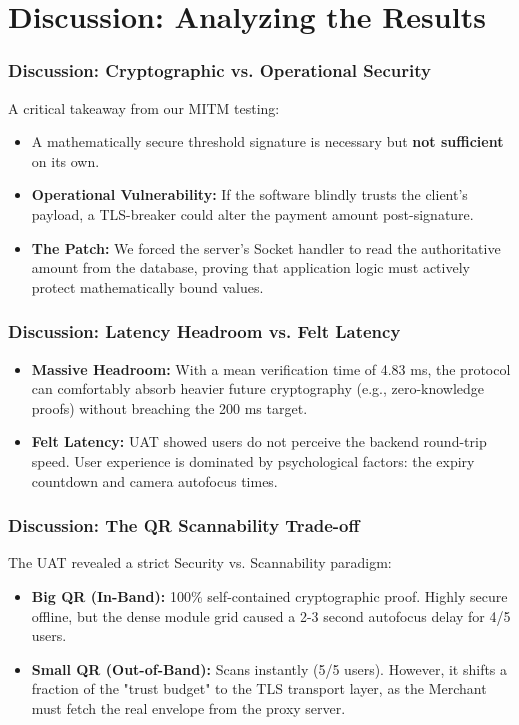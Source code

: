 \documentclass{beamer}
\begin{document}
\section{Discussion: Analyzing the Results}
\begin{frame}
  \frametitle{Discussion: Cryptographic vs. Operational Security}
  A critical takeaway from our MITM testing:
  \vspace{0.3cm}
  \begin{itemize}
      \item A mathematically secure threshold signature is necessary but \textbf{not sufficient} on its own.
      \item \textbf{Operational Vulnerability:} If the software blindly trusts the client's payload, a TLS-breaker could alter the payment amount post-signature.
      \item \textbf{The Patch:} We forced the server's Socket handler to read the authoritative amount from the database, proving that application logic must actively protect mathematically bound values.
  \end{itemize}
\end{frame}

\begin{frame}
  \frametitle{Discussion: Latency Headroom vs. Felt Latency}
  \begin{itemize}
      \item \textbf{Massive Headroom:} With a mean verification time of 4.83 ms, the protocol can comfortably absorb heavier future cryptography (e.g., zero-knowledge proofs) without breaching the 200 ms target.
      \item \textbf{Felt Latency:} UAT showed users do not perceive the backend round-trip speed. User experience is dominated by psychological factors: the expiry countdown and camera autofocus times.
  \end{itemize}
\end{frame}

\begin{frame}
  \frametitle{Discussion: The QR Scannability Trade-off}
  The UAT revealed a strict Security vs. Scannability paradigm:
  \vspace{0.3cm}
  \begin{itemize}
      \item \textbf{Big QR (In-Band):} 100\% self-contained cryptographic proof. Highly secure offline, but the dense module grid caused a 2-3 second autofocus delay for 4/5 users.
      \item \textbf{Small QR (Out-of-Band):} Scans instantly (5/5 users). However, it shifts a fraction of the "trust budget" to the TLS transport layer, as the Merchant must fetch the real envelope from the proxy server.
  \end{itemize}
\end{frame}
\end{document}
